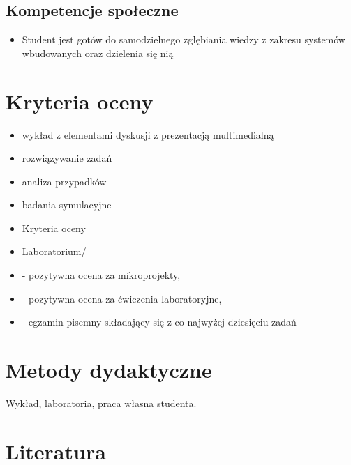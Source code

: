 \documentclass[12pt, a4paper]{article}
\begin{document}
\subsection*{Kompetencje społeczne}
\begin{itemize}
  \item Student jest gotów do samodzielnego zgłębiania wiedzy z zakresu systemów wbudowanych oraz dzielenia się nią
\end{itemize}

\section{Kryteria oceny}

\begin{itemize}
  \item wykład z elementami dyskusji z prezentacją multimedialną
  \item rozwiązywanie zadań
  \item analiza przypadków
  \item badania symulacyjne
  \item Kryteria oceny
  \item Laboratorium/
  \item - pozytywna ocena za mikroprojekty,
  \item - pozytywna ocena za ćwiczenia laboratoryjne,
  \item - egzamin pisemny składający się z co najwyżej dziesięciu zadań
\end{itemize}

\section{Metody dydaktyczne}

Wykład, laboratoria, praca własna studenta.

\section{Literatura}
\end{document}
